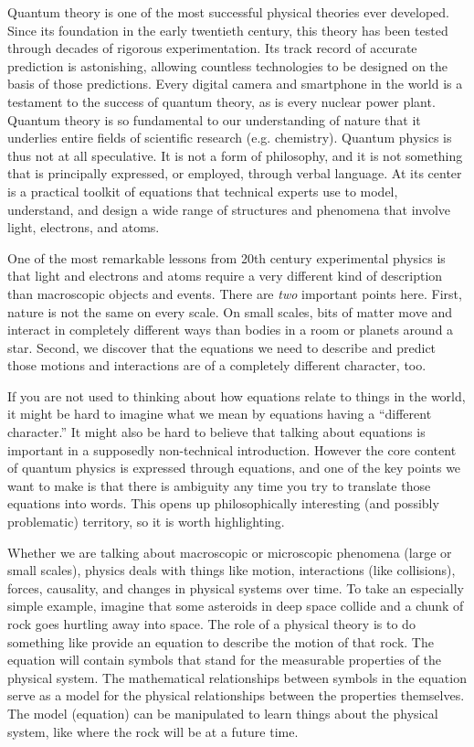 \documentclass[onecolumn,preprintnumbers,amsmath,amssymbn,reprint,nofootinbib,superscriptaddress]{revtex4}    %
\begin{document}
Quantum theory is one of the most successful physical theories ever developed.  Since its foundation in the early twentieth century, this theory has been tested through decades of rigorous experimentation. Its track record of accurate prediction is astonishing, allowing countless technologies to be designed on the basis of those predictions.  Every digital camera and smartphone in the world is a testament to the success of quantum theory, as is every nuclear power plant.  Quantum theory is so fundamental to our understanding of nature that it underlies entire fields of scientific research (e.g. chemistry).  Quantum physics is thus not at all speculative.  It is not a form of philosophy, and it is not something that is principally expressed, or employed, through verbal language.  At its center is a practical toolkit of equations that technical experts use to model, understand, and design a wide range of structures and phenomena that involve light, electrons, and atoms.  

One of the most remarkable lessons from 20th century experimental physics is that light and electrons and atoms require a very different kind of description than macroscopic objects and events.  There are {\em two} important points here. First, nature is not the same on every scale. On small scales, bits of matter move and interact in completely different ways than bodies in a room or planets around a star.  Second, we discover that the equations we need to describe and predict those motions and interactions are of a completely different character, too.  

If you are not used to thinking about how equations relate to things in the world, it might be hard to imagine what we mean by equations having a ``different character.''  It might also be hard to believe that talking about equations is important in a supposedly non-technical introduction. However the core content of quantum physics is expressed through equations, and one of the key points we want to make is that there is ambiguity any time you try to translate those equations into words.  This opens up philosophically interesting (and possibly problematic) territory, so it is worth highlighting.      

Whether we are talking about macroscopic or microscopic phenomena (large or small scales), physics deals with things like motion, interactions (like collisions), forces, causality, and changes in physical systems over time. To take an especially simple example, imagine that some asteroids in deep space collide and a chunk of rock goes hurtling away into space.  The role of a physical theory is to do something like provide an equation to describe the motion of that rock.  The equation will contain symbols that stand for the measurable properties of the physical system.  The mathematical relationships between symbols in the equation serve as a model for the physical relationships between the properties themselves.  The model (equation) can be manipulated to learn things about the physical system, like where the rock will be at a future time. 
\end{document}
